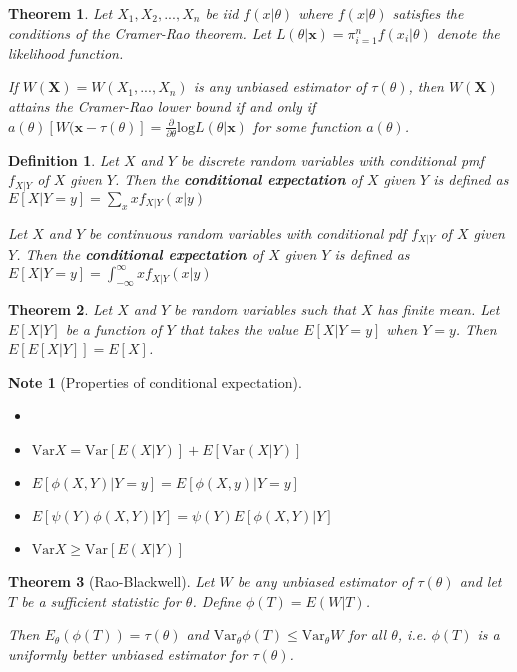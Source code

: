 \documentclass[14pt,twoside]{extreport}
\theoremstyle{dotless}
\newtheorem*{defn}{\footnotesize Definition}
\newtheorem*{thm}{\footnotesize Theorem} %
\newtheorem*{note}{\footnotesize Note} %
\begin{document}
\begin{thm}
    Let $X_1, X_2, ..., X_n$ be iid $f(x|\theta)$ where $f(x|\theta)$ satisfies the conditions of the Cramer-Rao theorem. Let $L(\theta|\bm{x}) = \pi_{i = 1}^n f(x_i|\theta)$ denote the likelihood function.

    If $W(\bm{X}) = W(X_1,..., X_n)$ is any unbiased estimator of $\tau(\theta)$, then $W(\bm{X})$ attains the Cramer-Rao lower bound if and only if $a(\theta)[W(\bm{x} - \tau(\theta)] = \frac{\partial}{\partial \theta} \text{log}L(\theta|\bm{x})$ for some function $a(\theta)$.
\end{thm}

\begin{defn}
    Let $X$ and $Y$ be discrete random variables with conditional pmf $f_{X|Y}$ of $X$ given $Y$. Then the \textbf{conditional expectation} of $X$ given $Y$ is defined as $E[X|Y=y] = \sum_{x} x f_{X|Y}(x|y)$

    Let $X$ and $Y$ be continuous random variables with conditional pdf $f_{X|Y}$ of $X$ given $Y$. Then the \textbf{conditional expectation} of $X$ given $Y$ is defined as $E[X|Y=y] = \int_{-\infty}^\infty x f_{X|Y}(x|y)$
\end{defn}


\begin{thm}
    Let $X$ and $Y$ be random variables such that $X$ has finite mean. 
    Let $E[X|Y]$ be a function of $Y$ that takes the value $E[X|Y=y]$ when $Y=y$.
    Then $E[E[X|Y]] = E[X]$.
\end{thm}

\begin{note}[Properties of conditional expectation]
    \begin{itemize}
        \item[]
        \item $\text{Var}X = \text{Var}[E(X|Y)] + E[\text{Var}(X|Y)]$
        \item $E[\phi(X,Y)|Y=y] = E[\phi(X,y)|Y=y]$
        \item $E[\psi(Y) \phi(X,Y)|Y] = \psi(Y) E[\phi(X,Y)|Y]$
        \item $\text{Var}X \geq \text{Var}[E(X|Y)]$
    \end{itemize}
\end{note}

\begin{thm}[Rao-Blackwell]
    Let $W$ be any unbiased estimator of $\tau(\theta)$ and let $T$ be a sufficient statistic for $\theta$. 
    Define $\phi(T) = E(W|T)$.

    Then $E_\theta(\phi(T)) = \tau(\theta)$ and $\text{Var}_\theta \phi(T) \leq \text{Var}_\theta W$ for all $\theta$, i.e. $\phi(T)$ is a uniformly better unbiased estimator for $\tau(\theta)$.
\end{thm}
\end{document}
